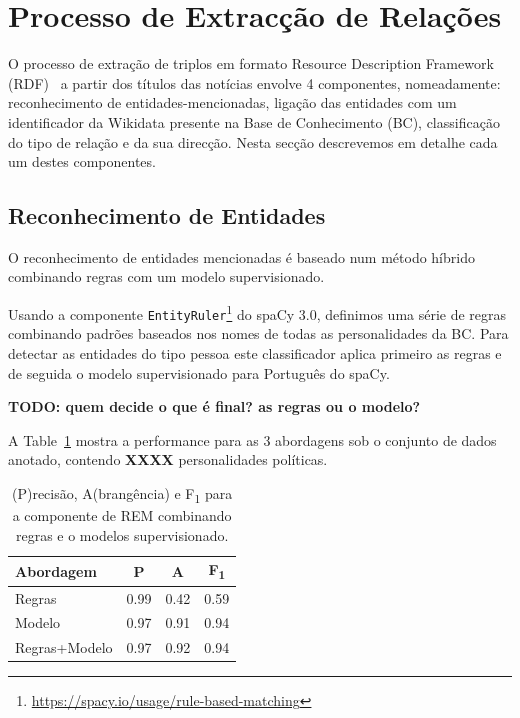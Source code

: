 \documentclass[a4paper, twocolumn, 11pt, twoside]{article}
\begin{document}
\section{Processo de Extracção de Relações}
\label{sec:classifiers}

O processo de extração de triplos em formato Resource Description Framework (RDF)~\citep{schreiber2014primer} a partir dos títulos das notícias envolve 4 componentes, nomeadamente: reconhecimento de entidades-mencionadas, ligação das entidades com um identificador da Wikidata presente na Base de Conhecimento (BC), classificação do tipo de relação e da sua direcção. Nesta secção descrevemos em detalhe cada um destes componentes.


\subsection{Reconhecimento de Entidades}
\label{subsec:ner}

O reconhecimento de entidades mencionadas é baseado num método híbrido combinando regras com um modelo supervisionado. 

Usando a componente \texttt{EntityRuler}\footnote{\url{https://spacy.io/usage/rule-based-matching}} do spaCy 3.0, definimos uma série de regras combinando padrões baseados nos nomes de todas as personalidades da BC. Para detectar as entidades do tipo pessoa este classificador aplica primeiro as regras e de seguida o modelo supervisionado para Português do spaCy.

\textbf{TODO: quem decide o que é final? as regras ou o modelo?}

A Table~\ref{tab:results_ner} mostra a performance para as 3 abordagens sob o conjunto de dados anotado, contendo {\bf XXXX} personalidades políticas.

\begin{table}[!h]
    \begin{center}
    \begin{tabular}{l ccc}
		{\bf Abordagem}  & {\bf P} & {\bf A} & {\bf F\textsubscript{1}} \\
        \hline
        Regras           &  0.99     &  0.42     & 		0.59		\\
        Modelo           &  0.97     &  0.91     & 		0.94		\\
		Regras+Modelo    &  0.97     &  0.92     & 		0.94		\\
    \end{tabular}
	\caption{ (P)recisão, A(brangência) e F\textsubscript{1} para a componente de REM combinando regras e o modelos supervisionado.}	
	\label{tab:results_ner}
	\end{center}
\end{table}
\end{document}
